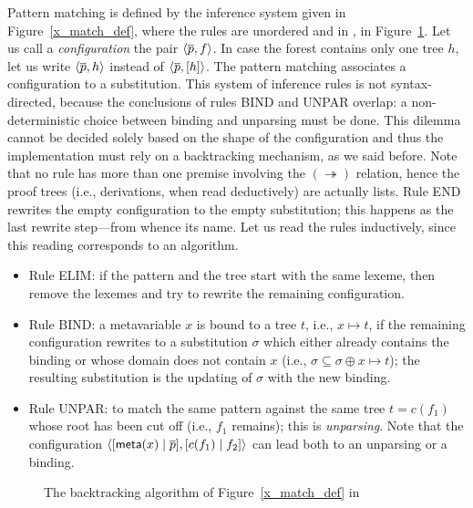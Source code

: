 Pattern matching is defined by the inference system given in
Figure~\ref{x_match_def}, where the rules are unordered and in
\Prolog, in Figure~\ref{x_match_prolog}. Let us call a
\emph{configuration} the pair \(\smat{f}{\overline{p}}\). In case the
forest contains only one tree \(h\), let us write
\(\smat{h}{\overline{p}}\) instead of
\(\smat{[h]}{\overline{p}}\). The pattern matching associates a
configuration to a substitution. This system of inference rules is not
syntax\hyp{}directed, because the conclusions of rules \textsf{BIND}
and \textsf{UNPAR} overlap: a non\hyp{}deterministic choice between
binding and unparsing must be done. This dilemma cannot be decided
solely based on the shape of the configuration and thus the
implementation must rely on a backtracking mechanism, as we said
before. Note that no rule has more than one premise involving the
\((\twoheadrightarrow)\) relation, hence the proof trees (i.e.,
derivations, when read deductively) are actually lists. Rule
\textsf{END} rewrites the empty configuration to the empty
substitution; this happens as the last rewrite step---from whence its
name. Let us read the rules inductively, since this reading
corresponds to an algorithm.
\begin{itemize}

  \item Rule \textsf{ELIM}: if the pattern and the tree start with the
    same lexeme, then remove the lexemes and try to rewrite the
    remaining configuration.

  \item Rule \textsf{BIND}: a meta\-variable \(x\) is bound to a tree
    \(t\), i.e., \(x \mapsto t\), if the remaining configuration
    rewrites to a substitution \(\sigma\) which either already
    contains the binding or whose domain does not contain \(x\) (i.e.,
    \(\sigma \subseteq \sigma \oplus x \mapsto t\)); the resulting
    substitution is the updating of \(\sigma\) with the new binding.

  \item Rule \textsf{UNPAR}: to match the same pattern against the
    same tree \(t = c(f_1)\) whose root has been cut off (i.e.,
    \(f_1\) remains); this is \emph{unparsing}. Note that the
    configuration
    \(\smat{\cons{c(f_1)}{f_2}}{\cons{\meta{x}}{\overline{p}}}\) can
    lead both to an unparsing or a binding.
\end{itemize}
\begin{figure}[t]
\caption{The backtracking algorithm of Figure~\ref{x_match_def} in
  \Prolog\label{x_match_prolog}}
\end{figure}
